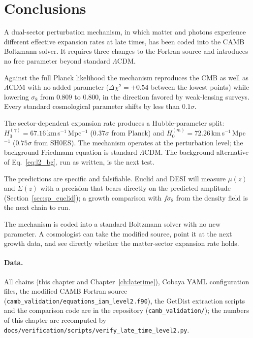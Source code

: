 \section{Conclusions}\label{sec:l2_conclusions}
A dual-sector perturbation mechanism, in which matter and photons experience different effective expansion rates at late times, has been coded into
the CAMB Boltzmann solver. It requires three changes to the Fortran source and introduces no free parameter beyond standard $\Lambda$CDM.

Against the full Planck likelihood the mechanism reproduces the CMB as well as $\Lambda$CDM with no added parameter ($\Delta\chi^2=+0.54$ between the lowest points)
while lowering $\sigma_8$ from $0.809$ to $0.800$, in the direction favored by weak-lensing surveys. Every standard cosmological parameter shifts by
less than $0.1\sigma$.

The sector-dependent expansion rate produces a Hubble-parameter split: $H_0^{(\gamma)}=67.16$\,km\,s$^{-1}$\,Mpc$^{-1}$ ($0.37\sigma$ from Planck) and
$H_0^{(m)}=72.26$\,km\,s$^{-1}$\,Mpc$^{-1}$ ($0.75\sigma$ from SH0ES). The mechanism operates at the perturbation level; the background Friedmann equation
is standard $\Lambda$CDM. The background alternative of Eq.~\eqref{eq:l2_bg}, run as written, is the next test.

The predictions are specific and falsifiable. Euclid and DESI will measure $\mu(z)$ and $\Sigma(z)$ with a precision that bears directly on the
predicted amplitude (Section~\ref{sec:sp_euclid}); a growth comparison with $f\sigma_8$ from the density field is the next chain to run.

The mechanism is coded into a standard Boltzmann solver with no new parameter. A cosmologist can take the modified source, point it at the next growth data, and see directly whether the matter-sector expansion rate holds.

\paragraph{Data.} All chains (this chapter and Chapter~\ref{ch:latetime}), Cobaya YAML configuration files, the modified CAMB Fortran source
(\texttt{camb\_validation/equations\_iam\_level2.f90}), the GetDist extraction scripts and the comparison code are in the repository
(\texttt{camb\_validation/}); the numbers of this chapter are recomputed by
\texttt{docs/\allowbreak{}verification/\allowbreak{}scripts/\allowbreak{}verify\_late\_time\_level2.py}.
